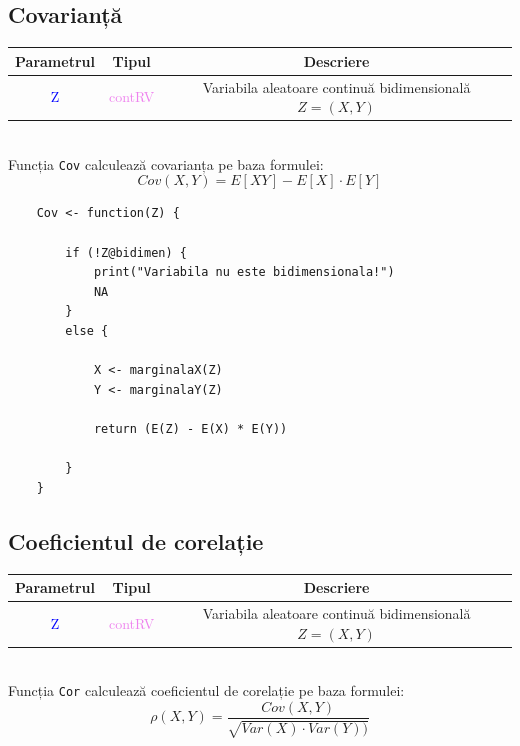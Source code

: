 \documentclass[12pt]{article}
\begin{document}
\subsection{Covarianță}
\begin{center}
	\begin{tabular}{|| c | c | c ||}
		\hline
		Parametrul & Tipul & Descriere \\
		\hline
		\textcolor{blue}{Z} & \textcolor{violet}{contRV} & Variabila aleatoare continuă bidimensională $Z = (X, Y)$ \\
		
		\hline
	\end{tabular}
\end{center}\hfill \\

Funcția \texttt{Cov} calculează covarianța pe baza formulei:
\begin{equation*}
	Cov(X, Y) = E[XY] - E[X] \cdot E[Y]
\end{equation*}

\begin{lstlisting}
	Cov <- function(Z) {
		
		if (!Z@bidimen) {
			print("Variabila nu este bidimensionala!")
			NA
		}
		else {
			
			X <- marginalaX(Z)
			Y <- marginalaY(Z)
			
			return (E(Z) - E(X) * E(Y))
			
		}
	}
\end{lstlisting}

\subsection{Coeficientul de corelație}
\begin{center}
	\begin{tabular}{|| c | c | c ||}
		\hline
		Parametrul & Tipul & Descriere \\
		\hline
		\textcolor{blue}{Z} & \textcolor{violet}{contRV} & Variabila aleatoare continuă bidimensională $Z = (X, Y)$ \\
		
		\hline
	\end{tabular}
\end{center}\hfill \\

Funcția \texttt{Cor} calculează coeficientul de corelație pe baza formulei:
\begin{equation*}
	\rho(X, Y) = \frac{Cov(X, Y)}{\sqrt{Var(X) \cdot Var(Y))}}
\end{equation*}\pagebreak
\end{document}
